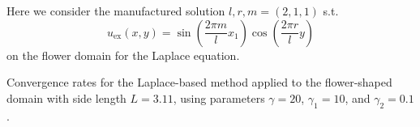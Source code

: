 Here we consider the manufactured solution $l,r,m = (2, 1, 1) $ s.t.
\[
u_{\text{ex}}(x,y) = \sin\left(\frac{2\pi m}{l}x_1\right)\cos\left(\frac{2\pi r}{l}y\right)
\]
on the flower domain for the Laplace equation.

\begin{table}

\caption{
Convergence rates for the Laplace-based method applied to the flower-shaped domain with side length $L=3.11$, using parameters $\gamma=20$, $\gamma_1=10$, and $\gamma_2=0.1$.
}
\end{table}




